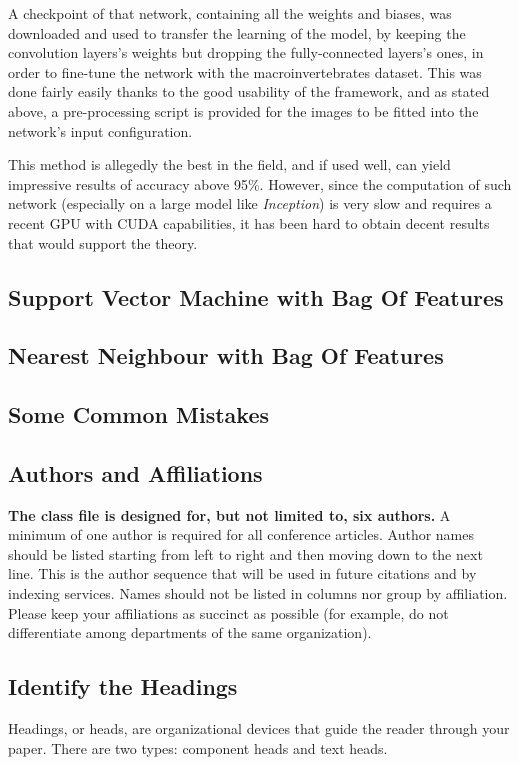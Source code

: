 \documentclass[conference]{IEEEtran}
\begin{document}
A checkpoint of that network, containing all the weights and biases, was downloaded and used to transfer the learning of the model, by keeping the convolution layers's weights but dropping the fully-connected layers's ones, in order to fine-tune the network with the macroinvertebrates dataset.
This was done fairly easily thanks to the good usability of the framework, and as stated above, a pre-processing script is provided for the images to be fitted into the network's input configuration.

This method is allegedly the best in the field, and if used well, can yield impressive results of accuracy above 95\%. However, since the computation of such network (especially on a large model like \emph{Inception}) is very slow and requires a recent GPU with CUDA capabilities, it has been hard to obtain decent results that would support the theory.

\subsection{Support Vector Machine with Bag Of Features}

\subsection{Nearest Neighbour with Bag Of Features}


\subsection{Some Common Mistakes}\label{SCM}

\subsection{Authors and Affiliations}
\textbf{The class file is designed for, but not limited to, six authors.} A 
minimum of one author is required for all conference articles. Author names 
should be listed starting from left to right and then moving down to the 
next line. This is the author sequence that will be used in future citations 
and by indexing services. Names should not be listed in columns nor group by 
affiliation. Please keep your affiliations as succinct as possible (for 
example, do not differentiate among departments of the same organization).

\subsection{Identify the Headings}
Headings, or heads, are organizational devices that guide the reader through 
your paper. There are two types: component heads and text heads.
\end{document}
